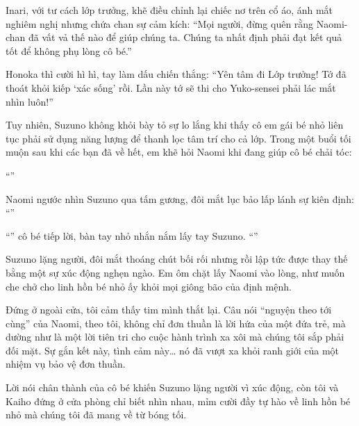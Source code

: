\documentclass[../main.tex]{subfiles}
\begin{document}
Inari, với tư cách lớp trưởng, khẽ điều chỉnh lại chiếc nơ trên cổ áo, ánh mắt nghiêm nghị nhưng chứa chan sự cảm kích: ``Mọi người, đừng quên rằng Naomi-chan đã vất vả thế nào để giúp chúng ta. Chúng ta nhất định phải đạt kết quả tốt để không phụ lòng cô bé.''

Honoka thì cười hì hì, tay làm dấu chiến thắng: ``Yên tâm đi Lớp trưởng! Tớ đã thoát khỏi kiếp `xác sống' rồi. Lần này tớ sẽ thi cho Yuko-sensei phải lác mắt nhìn luôn!''

Tuy nhiên, Suzuno không khỏi bày tỏ sự lo lắng khi thấy cô em gái bé nhỏ liên tục phải sử dụng năng lượng để thanh lọc tâm trí cho cả lớp. Trong một buổi tối muộn sau khi các bạn đã về hết, em khẽ hỏi Naomi khi đang giúp cô bé chải tóc:

``''

Naomi ngước nhìn Suzuno qua tấm gương, đôi mắt lục bảo lấp lánh sự kiên định: ``''

``'' cô bé tiếp lời, bàn tay nhỏ nhắn nắm lấy tay Suzuno. ``''

Suzuno lặng người, đôi mắt thoáng chút bối rối nhưng rồi lập tức được thay thế bằng một sự xúc động nghẹn ngào. Em ôm chặt lấy Naomi vào lòng, như muốn che chở cho linh hồn bé nhỏ ấy khỏi mọi giông bão của định mệnh.

Đứng ở ngoài cửa, tôi cảm thấy tim mình thắt lại. Câu nói ``nguyện theo tới cùng'' của Naomi, theo tôi, không chỉ đơn thuần là lời hứa của một đứa trẻ, mà dường như là một lời tiên tri cho cuộc hành trình xa xôi mà chúng tôi sắp phải đối mặt. Sự gắn kết này, tình cảm này\dots{} nó đã vượt xa khỏi ranh giới của một nhiệm vụ bảo vệ đơn thuần.

Lời nói chân thành của cô bé khiến Suzuno lặng người vì xúc động, còn tôi và Kaiho đứng ở cửa phòng chỉ biết nhìn nhau, mỉm cười đầy tự hào về linh hồn bé nhỏ mà chúng tôi đã mang về từ bóng tối.

\ct
\end{document}
